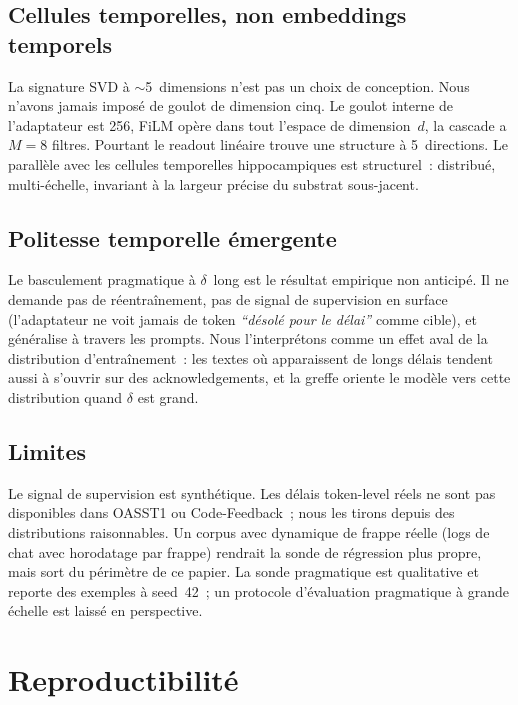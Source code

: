 \documentclass[10pt,twocolumn,letterpaper]{article}
\begin{document}
\subsection{Cellules temporelles, non embeddings temporels}

La signature SVD à $\sim$5~dimensions n'est pas un choix de conception. Nous n'avons jamais imposé de goulot de dimension cinq. Le goulot interne de l'adaptateur est 256, FiLM opère dans tout l'espace de dimension~$d$, la cascade a $M=8$ filtres. Pourtant le readout linéaire trouve une structure à 5~directions. Le parallèle avec les cellules temporelles hippocampiques est structurel~: distribué, multi-échelle, invariant à la largeur précise du substrat sous-jacent.

\subsection{Politesse temporelle émergente}

Le basculement pragmatique à $\delta$~long est le résultat empirique non anticipé. Il ne demande pas de réentraînement, pas de signal de supervision en surface (l'adaptateur ne voit jamais de token \emph{``désolé pour le délai''} comme cible), et généralise à travers les prompts. Nous l'interprétons comme un effet aval de la distribution d'entraînement~: les textes où apparaissent de longs délais tendent aussi à s'ouvrir sur des acknowledgements, et la greffe oriente le modèle vers cette distribution quand $\delta$ est grand.

\subsection{Limites}

Le signal de supervision est synthétique. Les délais token-level réels ne sont pas disponibles dans OASST1 ou Code-Feedback~; nous les tirons depuis des distributions raisonnables. Un corpus avec dynamique de frappe réelle (logs de chat avec horodatage par frappe) rendrait la sonde de régression plus propre, mais sort du périmètre de ce papier. La sonde pragmatique est qualitative et reporte des exemples à seed~42~; un protocole d'évaluation pragmatique à grande échelle est laissé en perspective.

\section{Reproductibilité}
\end{document}
